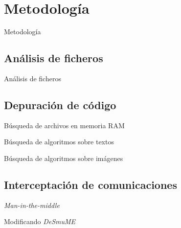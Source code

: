 
\section{Metodología}
\begin{frame}{Metodología}
\end{frame}

\subsection{Análisis de ficheros}
\begin{frame}{Análisis de ficheros}

\end{frame}

\subsection{Depuración de código}
\begin{frame}{Búsqueda de archivos en memoria RAM}

\end{frame}

\begin{frame}{Búsqueda de algoritmos sobre textos}

\end{frame}

\begin{frame}{Búsqueda de algoritmos sobre imágenes}

\end{frame}

\subsection{Interceptación de comunicaciones}
\begin{frame}{\textit{Man-in-the-middle}}

\end{frame}

\begin{frame}{Modificando \textit{DeSmuME}}

\end{frame}
